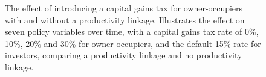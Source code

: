 \begin{figure}[h!tb]   
    \centering
     \caption[The effect of introducing a capital gains tax for owner-occupiers with and without a productivity linkage]{The effect of introducing a capital gains tax for owner-occupiers with and without a productivity linkage. Illustrates the effect on seven policy variables over time, with a capital gains tax rate of 0\%, 10\%, 20\% and 30\% for owner-occupiers, and the default 15\% rate for investors, comparing a productivity linkage and no productivity linkage.}
    \label{fig:CG-pers_link_W-WO-Cost-of-capital}
\end{figure}



